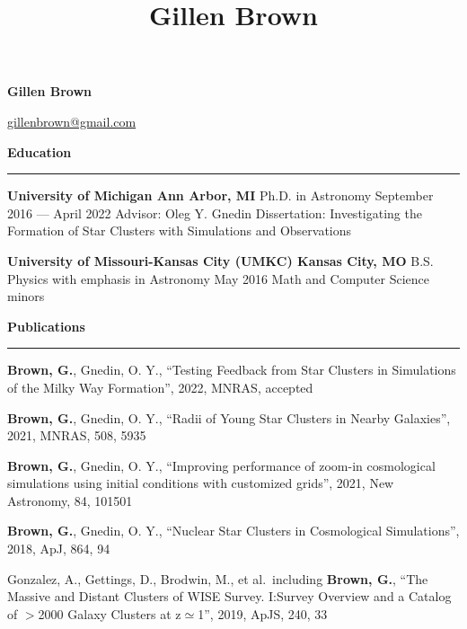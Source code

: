 \documentclass[10pt]{article}
\title{Gillen Brown}
\newcommand{\header}[1]{\vspace{2em}\par \textbf{\large #1}\strut\hrule\vspace{0em}}
\newcommand{\actionHeader}[2]{\textbf{#1 \hfill #2}}
\newcommand{\indentedItemDate}[2]{\newline\null\qquad #1 \hfill #2}
\newcommand{\indentedItem}[1]{\newline\null\qquad #1}
\begin{document}
\thispagestyle{empty}


\begin{center}
{\huge \bf Gillen Brown}

\href{mailto:gillenbrown@gmail.com}{gillenbrown@gmail.com} 
\end{center}
\bigskip



\header{Education}
\actionHeader{University of Michigan}{Ann Arbor, MI}
\indentedItemDate{Ph.D. in Astronomy}{September 2016 --- April 2022}
\indentedItem{Advisor: Oleg Y. Gnedin} 
\indentedItem{Dissertation: Investigating the Formation of Star Clusters with Simulations and Observations}

\actionHeader{University of Missouri-Kansas City (UMKC)}{Kansas City, MO}
\indentedItemDate{B.S. Physics with emphasis in Astronomy}{May 2016}
\indentedItem{Math and Computer Science minors}

\header{Publications}
\begin{etaremune}
    \item \textbf{Brown, G.}, Gnedin, O. Y., ``Testing Feedback from Star Clusters in Simulations of the Milky Way Formation'', 2022, MNRAS, accepted 
    \item \textbf{Brown, G.}, Gnedin, O. Y.,  ``Radii of Young Star Clusters in Nearby Galaxies'', 2021, MNRAS, 508, 5935
    \item \textbf{Brown, G.}, Gnedin, O. Y.,  ``Improving performance of zoom-in cosmological simulations using initial conditions with customized grids'', 2021, New Astronomy, 84, 101501
    \item \textbf{Brown, G.}, Gnedin, O. Y.,  ``Nuclear Star Clusters in Cosmological Simulations'', 2018, ApJ, 864, 94
    \item Gonzalez, A., Gettings, D., Brodwin, M., et al.\ including \textbf{Brown, G.}, ``The Massive and Distant Clusters of WISE Survey. I:\@ Survey Overview and a Catalog of $>$2000 Galaxy Clusters at z$\simeq$1'', 2019, ApJS, 240, 33
\end{etaremune}
\end{document}
